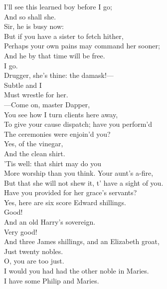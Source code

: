 \documentclass[a4paper,oneside]{memoir}
\begin{document}
\begin{drama*}
I'll see this learned boy before I go;\\
And so shall she.\\
\facespeaks {} Sir, he is busy now:\\
But if you have a sister to fetch hither,\\
Perhaps your own pains may command her sooner;\\
And he by that time will be free.\\
\kastrilspeaks {} I go.\\
\facespeaks Drugger, she's thine: the damask!---\\
Subtle and I\\
Must wrestle for her.\\
---Come on, master Dapper,\\
You see how I turn clients here away,\\
To give your cause dispatch; have you perform'd\\
The ceremonies were enjoin'd you?\\
\dapperspeaks {} Yes, of the vinegar,\\
And the clean shirt.\\
\facespeaks {} 'Tis well: that shirt may do you\\
More worship than you think. Your aunt's a-fire,\\
But that she will not shew it, t' have a sight of you.\\
Have you provided for her grace's servants?\\
\dapperspeaks Yes, here are six score Edward shillings.\\
\facespeaks {} Good!\\
\dapperspeaks And an old Harry's sovereign.\\
\facespeaks {} Very good!\\
\dapperspeaks And three James shillings, and an Elizabeth groat,\\
Just twenty nobles.\\
\facespeaks {} O, you are too just.\\
I would you had had the other noble in Maries.\\
\dapperspeaks I have some Philip and Maries.\\

\end{drama*}
\end{document}
